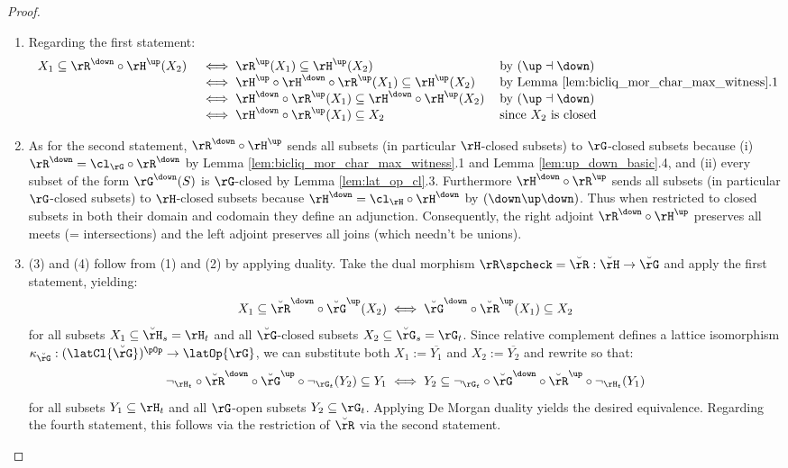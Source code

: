 \documentclass{article}
\begin{document}
\begin{proof}
\item
\begin{enumerate}

\item
Regarding the first statement:
\[
\begin{tabular}{lll}
$X_1 \subseteq \rR^\down \circ \rH^\up(X_2)$
&
$\iff \rR^\up(X_1) \subseteq \rH^\up(X_2)$
& by $(\up\dashv\down)$
\\&
$\iff \rH^\up \circ \rH^\down \circ \rR^\up(X_1) \subseteq \rH^\up(X_2)$
& by Lemma \ref{lem:bicliq_mor_char_max_witness}.1
\\&
$\iff \rH^\down \circ \rR^\up(X_1) \subseteq \rH^\down \circ \rH^\up(X_2)$
& by $(\up\dashv\down)$
\\&
$\iff \rH^\down \circ \rR^\up(X_1) \subseteq X_2$
& since $X_2$ is closed
\end{tabular}
\]

\item
As for the second statement, $\rR^\down \circ \rH^\up$ sends all subsets (in particular $\rH$-closed subsets) to $\rG$-closed subsets because (i) $\rR^\down = \cl_\rG \circ \rR^\down$ by Lemma \ref{lem:bicliq_mor_char_max_witness}.1 and Lemma \ref{lem:up_down_basic}.4, and (ii) every subset of the form $\rG^\down(S)$ is $\rG$-closed by Lemma \ref{lem:lat_op_cl}.3. Furthermore $\rH^\down \circ \rR^\up$ sends all subsets (in particular $\rG$-closed subsets) to $\rH$-closed subsets because $\rH^\down = \cl_\rH \circ \rH^\down$ by $(\down\up\down)$. Thus when restricted to closed subsets in both their domain and codomain they define an adjunction. Consequently, the right adjoint $\rR^\down \circ \rH^\up$ preserves all meets (= intersections) and the left adjoint preserves all joins (which needn't be unions).

\item
(3) and (4) follow from (1) and (2) by applying duality. Take the dual morphism $\rR\spcheck = \breve{\rR} : \breve{\rH} \to \breve{\rG}$ and apply the first statement, yielding:
\[
X_1 \subseteq \breve{\rR}^\down \circ \breve{\rG}^\up(X_2) 
\iff
\breve{\rG}^\down \circ \breve{\rR}^\up(X_1) \subseteq X_2
\]
for all subsets $X_1 \subseteq \breve{\rH}_s = \rH_t$ and all $\breve{\rG}$-closed subsets $X_2 \subseteq \breve{\rG}_s = \rG_t$. Since relative complement defines a lattice isomorphism $\kappa_{\breve{\rG}} : (\latCl{\breve{\rG}})^{\pOp} \to \latOp{\rG}$, we can substitute both $X_1 := \overline{Y_1}$ and $X_2 := \overline{Y_2}$ and rewrite so that:
\[
\neg_{\rH_t} \circ \breve{\rR}^\down \circ \breve{\rG}^\up \circ \neg_{\rG_t}(Y_2) \subseteq Y_1 
\iff
Y_2 \subseteq \neg_{\rG_t} \circ \breve{\rG}^\down \circ \breve{\rR}^\up \circ \neg_{\rH_t}(Y_1)
\]
for all subsets $Y_1 \subseteq \rH_t$ and all $\rG$-open subsets $Y_2 \subseteq \rG_t$. Applying De Morgan duality yields the desired equivalence. Regarding the fourth statement, this follows via the restriction of $\breve{\rR}$ via the second statement.
\end{enumerate}
\end{proof}
  
\end{document}
